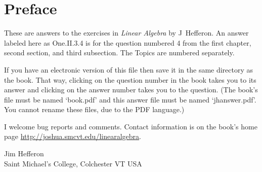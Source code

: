 \documentclass[twoside]{book}
\begin{document}

\frontmatter
\chapter*{Preface}
These are answers to the exercises in \textit{Linear Algebra} by
J~Hef{}feron.
An answer labeled here as
One.II.3.4 is for the question numbered 4 
from the first chapter,
second section, and third subsection.
The Topics are numbered separately.

If you have an electronic version of this file then
save it in the same directory as the book.
That way, 
clicking on the question number in the book takes you to its answer
and clicking on the answer number takes you to the question.
(The book's file must be named `book.pdf' and this answer file must be
named `jhanswer.pdf'. 
You cannot rename these files, due to the PDF language.)

I welcome bug reports and comments.
Contact information is on the book's home page 
\url{http://joshua.smcvt.edu/linearalgebra}.

\vspace{.5in}
\begin{raggedright}
Jim Hef{}feron     \\
Saint Michael's College, Colchester VT USA \\

\end{raggedright}
\clearemptydoublepage\tableofcontents
\setcounter{page}{1}
\mainmatter
\thispagestyle{empty}

\end{document}
